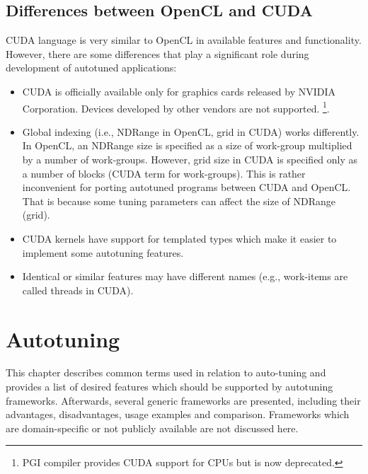\documentclass[
  digital,     %
  oneside,     %
  nosansbold,  %
  nocolorbold, %
  lof,         %
  lot,         %
  nocover
]{fithesis4}
\begin{document}
\subsection{Differences between OpenCL and CUDA}
CUDA language is very similar to OpenCL in available features and functionality. However, there are some differences that play a significant role during development of autotuned applications:
\begin{itemize}
	\item CUDA is officially available only for graphics cards released by NVIDIA Corporation. Devices developed by other vendors are not supported. \footnote{PGI compiler provides CUDA support for CPUs but is now deprecated.}.
	\item Global indexing (i.e., NDRange in OpenCL, grid in CUDA) works differently. In OpenCL, an NDRange size is specified as a size of work-group multiplied by a number of work-groups. However, grid size in CUDA is specified only as a number of blocks (CUDA term for work-groups). This is rather inconvenient for porting autotuned programs between CUDA and OpenCL. That is because some tuning parameters can affect the size of NDRange (grid).
	\item CUDA kernels have support for templated types which make it easier to implement some autotuning features.
	\item Identical or similar features may have different names (e.g., work-items are called threads in CUDA).
\end{itemize}

\section{Autotuning}
This chapter describes common terms used in relation to auto-tuning and provides a list of desired features which should be supported by autotuning frameworks. Afterwards, several generic frameworks are presented, including their advantages, disadvantages, usage examples and comparison. Frameworks which are domain-specific or not publicly available are not discussed here.
\end{document}
